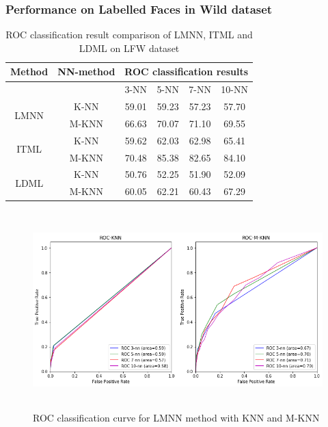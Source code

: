 \documentclass{article}
\begin{document}
\subsubsection{Performance on Labelled Faces in Wild dataset}

\begin{table}[H]
    \centering
    \begin{tabular}{|*{6}{c|}}
    \hline
    \multicolumn{1}{|c}{Method} & \multicolumn{1}{|c|}{NN-method} & \multicolumn{4}{|c|}{ROC classification results} \\ \hline
    \multicolumn{1}{|c|}{} & \multicolumn{1}{|c|}{} & 3-NN & 5-NN & 7-NN & 10-NN \\ \hline
    \multirow{2}{*}{LMNN} & K-NN & 59.01 & 59.23 & 57.23 & 57.70 \\ \cline{2-6}
    & M-KNN & 66.63 & 70.07 & 71.10 & 69.55 \\ \hline
    \multirow{2}{*}{ITML} & K-NN & 59.62 & 62.03 & 62.98 & 65.41 \\ \cline{2-6}
    & M-KNN & 70.48 & 85.38 & 82.65 & 84.10 \\ \hline
    \multirow{2}{*}{LDML} & K-NN & 50.76 & 52.25 & 51.90 & 52.09 \\ \cline{2-6}
    & M-KNN & 60.05 & 62.21 & 60.43 & 67.29 \\ \hline
    \end{tabular}
    \caption{ROC classification result comparison of LMNN, ITML and LDML on LFW dataset}
    \label{tab:my_label}
\end{table}

\begin{figure}[H]
    \centering
    \includegraphics[height=3in]{./lmnn_lfw_result.png}
    \caption[LMNN: ROC on LFW dataset]{ROC classification curve for LMNN method with KNN and M-KNN}
    \label{fig:fig_name}
\end{figure}
\end{document}
